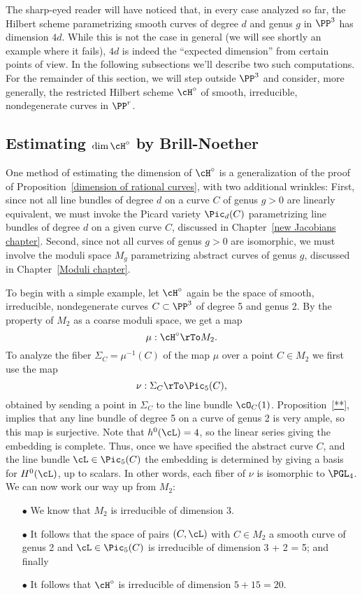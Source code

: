 The sharp-eyed reader will have noticed that, in every case analyzed so far,  the Hilbert scheme parametrizing smooth curves of degree $d$ and genus $g$ in $\PP^3$ has dimension $4d$. While this is not the case in general (we will see shortly an example where it fails), $4d$ is indeed the ``expected dimension'' from certain points of view. In the following subsections we'll describe two such computations. For the remainder of this section, we will step outside $\PP^3$ and consider, more generally, the restricted Hilbert scheme $\cH^\circ$ of smooth, irreducible, nondegenerate curves in $\PP^r$.

\subsection{Estimating $\dim \cH^\circ$ by Brill-Noether}

One method of estimating  the dimension of $\cH^\circ$ is a generalization of the proof of Proposition~\ref{dimension of rational curves}, with two additional wrinkles: First, since not all line bundles of degree $d$ on a curve $C$ of genus $g > 0$ are linearly equivalent, we must invoke the Picard variety $\Pic_d(C)$ parametrizing line bundles of degree $d$ on a given curve $C$, discussed in Chapter~\ref{new Jacobians chapter}. Second, since not all curves of genus $g > 0$ are isomorphic, we must involve the moduli space  $M_g$ parametrizing abstract curves of genus $g$, discussed in Chapter~\ref{Moduli chapter}.

To begin with a simple example, let $\cH^\circ$ again be the space of smooth, irreducible, nondegenerate curves $C \subset \PP^3$ of degree 5 and genus 2. By the property of $M_{2}$ as a coarse moduli space, we get a map
$$
\mu : \cH^\circ \rTo M_2.
$$
To analyze the fiber $\Sigma_C =\mu^{-1}(C)$ of the map $\mu$ over a point $C \in M_2$ we first use the map
$$
\nu : \Sigma_C \rTo \Pic_5(C),
$$
obtained by sending a point in $\Sigma_C$ to the line bundle $\cO_C(1)$. Proposition~\ref{**}, implies that any line bundle of degree 5 on a curve of genus 2 is very ample, so this map is surjective. Note that 
$h^0(\cL) = 4$, so the linear series  giving the embedding is complete. Thus, once we have specified the abstract curve $C$, and the line bundle $\cL \in \Pic_5(C)$ the embedding is determined by giving a basis for $H^0(\cL)$, up to scalars. In other words, each fiber of $\nu$ is isomorphic to $\PGL_4$. We can now work our way up from $M_2$:

\begin{enumerate}

\item[$\bullet$] We know that $M_2$ is irreducible of dimension 3.

\item[$\bullet$] It follows that the space of pairs $(C,\cL)$ with $C \in M_2$ a smooth curve of genus 2 and $\cL \in \Pic_5(C)$ is irreducible of dimension 3 + 2 = 5; and finally

\item[$\bullet$] It follows that $\cH^\circ$ is irreducible of dimension $5 + 15 = 20$.

\end{enumerate}

